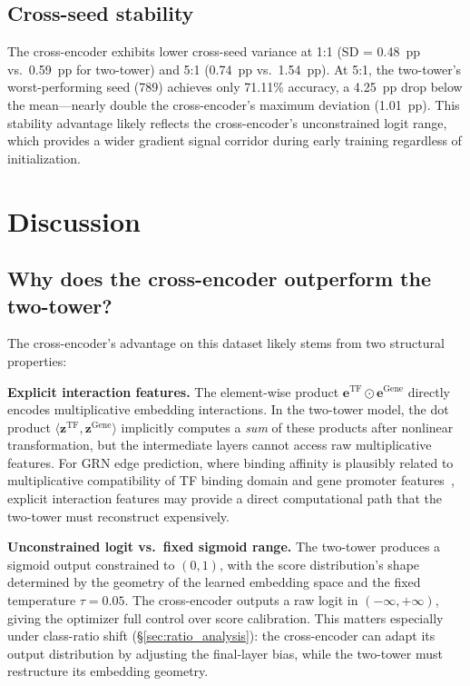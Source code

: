 \documentclass[10pt,twocolumn]{article}
\begin{document}
\subsection{Cross-seed stability}
\label{sec:stability}

The cross-encoder exhibits lower cross-seed variance at 1:1 (SD = 0.48~pp
vs.\ 0.59~pp for two-tower) and 5:1 (0.74~pp vs.\ 1.54~pp).
At 5:1, the two-tower's worst-performing seed (789) achieves only 71.11\%
accuracy, a 4.25~pp drop below the mean---nearly double the cross-encoder's
maximum deviation (1.01~pp).
This stability advantage likely reflects the cross-encoder's unconstrained
logit range, which provides a wider gradient signal corridor during early
training regardless of initialization.

\section{Discussion}
\label{sec:discussion}

\subsection{Why does the cross-encoder outperform the two-tower?}

The cross-encoder's advantage on this dataset likely stems from two structural
properties:

\textbf{Explicit interaction features.}
The element-wise product $\mathbf{e}^{\text{TF}} \odot \mathbf{e}^{\text{Gene}}$
directly encodes multiplicative embedding interactions.
In the two-tower model, the dot product $\langle \mathbf{z}^{\text{TF}},
\mathbf{z}^{\text{Gene}} \rangle$ implicitly computes a \emph{sum} of these
products after nonlinear transformation, but the intermediate layers cannot
access raw multiplicative features.
For GRN edge prediction, where binding affinity is plausibly related to
multiplicative compatibility of TF binding domain and gene promoter
features~\cite{yang2015embedding}, explicit interaction features may provide a
direct computational path that the two-tower must reconstruct expensively.

\textbf{Unconstrained logit vs.\ fixed sigmoid range.}
The two-tower produces a sigmoid output constrained to $(0, 1)$, with the score
distribution's shape determined by the geometry of the learned embedding space
and the fixed temperature $\tau = 0.05$.
The cross-encoder outputs a raw logit in $(-\infty, +\infty)$, giving the
optimizer full control over score calibration.
This matters especially under class-ratio shift (\S\ref{sec:ratio_analysis}):
the cross-encoder can adapt its output distribution by adjusting the final-layer
bias, while the two-tower must restructure its embedding geometry.
\end{document}
